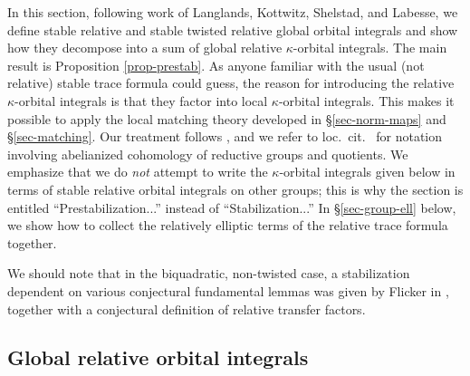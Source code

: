 \documentclass[12pt]{amsart}
\theoremstyle{remark}
\numberwithin{equation}{section}
\theoremstyle{definition}
\numberwithin{equation}{subsection}
\begin{document}
In this section, following work of Langlands, Kottwitz, Shelstad, and Labesse, we define
stable relative and stable twisted relative global orbital integrals and show how they decompose into a sum of global
relative $\kappa$-orbital integrals.  The main result is Proposition \ref{prop-prestab}.
As anyone familiar with the usual (not relative) stable trace formula could guess,
the reason for introducing the relative $\kappa$-orbital integrals is that they factor into local $\kappa$-orbital integrals.  This makes
it possible to apply the local matching theory developed in \S \ref{sec-norm-maps} and \S \ref{sec-matching}.
Our treatment follows \cite{Lab}, and we refer to loc.~cit.~ for notation involving abelianized cohomology of reductive groups and quotients.
We emphasize that we do \emph{not} attempt to write the $\kappa$-orbital integrals given below in terms of stable relative orbital integrals
on other groups; this is why the section is entitled ``Prestabilization...'' instead of ``Stabilization...''  In \S \ref{sec-group-ell} below,
we show how to collect the relatively elliptic terms of the relative trace formula together.

We should note that in the biquadratic, non-twisted case, a stabilization dependent on various conjectural fundamental lemmas
was given by Flicker in \cite{FlickerStable}, together with a conjectural definition
of relative transfer factors.

\subsection{Global relative orbital integrals}
\end{document}
